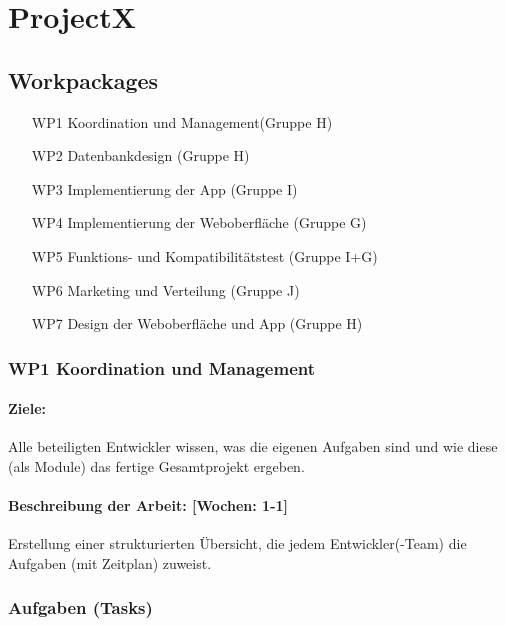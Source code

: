 \documentclass{report}
\begin{document}
\chapter{ProjectX}


\section*{Workpackages}

\begin{enumerate}
\item [WP1] Koordination und Management(Gruppe H)
\item [WP2] Datenbankdesign (Gruppe H)
\item [WP3] Implementierung der App (Gruppe I)
\item [WP4] Implementierung der Weboberfläche (Gruppe G)
\item [WP5] Funktions- und Kompatibilitätstest (Gruppe I+G)
\item [WP6] Marketing und Verteilung (Gruppe J)
\item [WP7] Design der Weboberfläche und App (Gruppe H)
\end{enumerate}


\subsection*{WP1 Koordination und Management}

\subsubsection{Ziele:} Alle beteiligten Entwickler wissen, was die eigenen Aufgaben sind und wie diese (als Module) das fertige Gesamtprojekt ergeben.
\subsubsection{Beschreibung der Arbeit: [Wochen: 1-1]} Erstellung einer strukturierten Übersicht, die jedem Entwickler(-Team) die Aufgaben (mit Zeitplan) zuweist.

\subsection*{Aufgaben (Tasks)}
\end{document}
